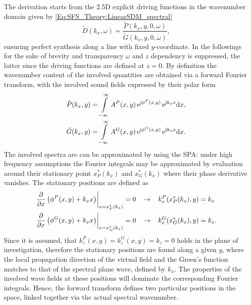 The derivation starts from the 2.5D explicit driving functions in the wavenumber domain given by \eqref{Eq:SFS_Theory:LinearSDM_spectral}
\begin{equation}
\tilde{D}(k_x,\omega) = \frac{\tilde{P}(k_x,y,0, \omega)}{\tilde{G}(k_x,y,0, \omega)},
\end{equation}
ensuring perfect synthesis along a line with fixed $y$-coordinate.
In the followings for the sake of brevity and transparency $\omega$ and $z$ dependency is suppressed, the latter since the driving functions are defined at $z=0$.
By definition the wavenumber content of the involved quantities are obtained via a forward Fourier transform, with the involved sound fields expressed by their polar form
\begin{align} 
\tilde{P}(k_x,y) = \int\limits_{-\infty}^{\infty} A^P(x,y) \, \mathrm{e}^{\mathrm{j} \phi^P(x,y)} \, \mathrm{e}^{\mathrm{j} k_x x} \mathrm{d} x, \\
\tilde{G}(k_x,y) = \int\limits_{-\infty}^{\infty} A^G(x,y) \, \mathrm{e}^{\mathrm{j} \phi^G(x,y)} \, \mathrm{e}^{\mathrm{j} k_x x} \mathrm{d} x.
\end{align}
The involved spectra are can be approximated by using the SPA:
under high frequency assumptions the Fourier integrals may be approximated by evaluation around their stationary point $x^*_P(k_x)$ and $x^*_G(k_x)$ where their phase derivative vanishes. 
The stationary positions are defined as
\begin{align}	
\label{eq:xP_xG_in_spatial_domain}
\left. \frac{\partial}{\partial x} \left(  \phi^P(x,y) + k_x x \right )\right|_{x = x^*_P(k_x)} = 0
\hspace{3mm} &\rightarrow \hspace{3mm}
k_x^P(x^*_P(k_x),y) = k_x \nonumber
\\ 
\left. \frac{\partial}{\partial x} \left( \phi^G(x,y) + k_x x \right )\right|_{x = x^*_G(k_x)} = 0
\hspace{3mm} &\rightarrow \hspace{3mm}
k_x^G(x^*_G(k_x),y) = k_x.
\end{align}
Since it is assumed, that $k_z^P(x,y) = k_z^G(x,y) = k_z = 0$ holds in the plane of investigation, therefore the stationary positions are found along a given $y$, where the local propagation direction of the virtual field and the Green's function matches to that of the spectral plane wave, defined by $k_x$.
The properties of the involved wave fields at these positions will dominate the corresponding Fourier integrals.
Hence, the forward transform defines two particular positions in the space, linked together via the actual spectral wavenumber.

